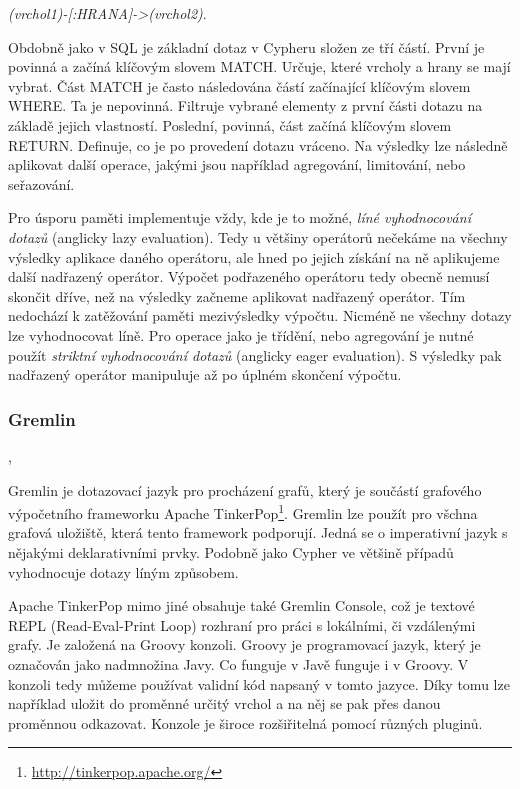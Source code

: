 \documentclass[
  program=infoi,
  biblatex=true,
  sourcecodes=true,
  figures=true,
  glossaries=false,
  index
]{kidiplom}
\begin{document}
\begin{center}
\textit{(vrchol1)-[:HRANA]->(vrchol2)}.
\end{center}

Obdobně jako v SQL je základní dotaz v Cypheru složen ze tří částí. První je povinná a začíná klíčovým slovem MATCH. Určuje, které vrcholy a hrany se mají vybrat. Část MATCH je často následována částí začínající klíčovým slovem WHERE. Ta je nepovinná. Filtruje vybrané elementy z první části dotazu na základě jejich vlastností. Poslední, povinná, část začíná klíčovým slovem RETURN. Definuje, co je po provedení dotazu vráceno. Na výsledky lze následně aplikovat další operace, jakými jsou například agregování, limitování, nebo seřazování.

Pro úsporu paměti implementuje vždy, kde je to možné, \textit{líné vyhodnocování dotazů} (anglicky lazy evaluation). Tedy u většiny operátorů nečekáme na všechny výsledky aplikace daného operátoru, ale hned po jejich získání na ně aplikujeme další nadřazený operátor. Výpočet podřazeného operátoru tedy obecně nemusí skončit dříve, než na výsledky začneme aplikovat nadřazený operátor. Tím nedochází k zatěžování paměti mezivýsledky výpočtu. Nicméně ne všechny dotazy lze vyhodnocovat líně. Pro operace jako je třídění, nebo agregování je nutné použít \textit{striktní vyhodnocování dotazů} (anglicky eager evaluation). S výsledky pak nadřazený operátor manipuluje až po úplném skončení výpočtu.

\subsubsection{Gremlin}
\cite{practicalGremlin}, \cite{tinkerPopDoc}

Gremlin je dotazovací jazyk pro procházení grafů, který je součástí grafového výpočetního frameworku Apache TinkerPop\footnote{\url{http://tinkerpop.apache.org/}}. Gremlin lze použít pro všchna grafová uložiště, která tento framework podporují. Jedná se o imperativní jazyk s nějakými deklarativními prvky. Podobně jako Cypher ve většině případů vyhodnocuje dotazy líným způsobem.

Apache TinkerPop mimo jiné obsahuje také Gremlin Console, což je textové REPL (Read-Eval-Print Loop) rozhraní pro práci s lokálními, či vzdálenými grafy. Je založená na Groovy konzoli. Groovy je programovací jazyk, který je označován jako nadmnožina Javy. Co funguje v Javě funguje i v Groovy. V konzoli tedy můžeme používat validní kód napsaný v tomto jazyce. Díky tomu lze například uložit do proměnné určitý vrchol a na něj se pak přes danou proměnnou odkazovat. Konzole je široce rozšiřitelná pomocí různých pluginů.
\end{document}
